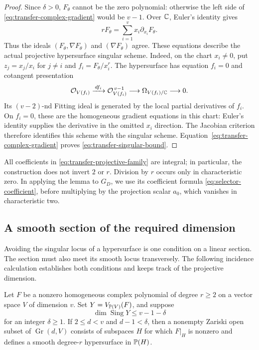\begin{proof}
Since \(\delta>0\), \(F_\theta\) cannot be the zero polynomial:
otherwise the left side of \eqref{eq:transfer-complex-gradient}
would be \(v-1\).  Over \(\mathbb C\), Euler's identity gives
\[
 rF_\theta=\sum_{i=1}^v x_i\partial_{x_i}F_\theta.
\]
Thus the ideals \((F_\theta,\nabla F_\theta)\) and
\((\nabla F_\theta)\) agree.  These equations describe the actual
projective hypersurface singular scheme.  Indeed, on the chart
\(x_i\ne0\), put \(z_j=x_j/x_i\) for \(j\ne i\) and
\(f_i=F_\theta/x_i^r\).  The hypersurface has equation \(f_i=0\)
and cotangent presentation
\[
 \mathcal O_{V(f_i)}
 \xrightarrow{\,df_i\,}
 \mathcal O_{V(f_i)}^{\,v-1}
 \longrightarrow\Omega_{V(f_i)/\mathbb C}\longrightarrow0.
\]
Its \((v-2)\)-nd Fitting ideal is generated by the local partial
derivatives of \(f_i\).  On \(f_i=0\), these are the homogeneous
gradient equations in this chart: Euler's identity supplies the
derivative in the omitted \(x_i\) direction.  The Jacobian criterion
therefore identifies this scheme with the singular scheme.
Equation~\eqref{eq:transfer-complex-gradient} proves
\eqref{eq:transfer-singular-bound}.
\end{proof}

All coefficients in \eqref{eq:transfer-projective-family} are integral;
in particular, the construction does not invert \(2\) or \(r\).
Division by \(r\) occurs only in characteristic zero.  In applying the
lemma to \(G_D\), we use its coefficient formula
\eqref{eq:selector-coefficient}, before multiplying by the projection
scalar \(a_0\), which vanishes in characteristic two.

\subsection{A smooth section of the required dimension}

Avoiding the singular locus of a hypersurface is one condition on a
linear section.  The section must also meet its smooth locus
transversely.  The following incidence calculation establishes both
conditions and keeps track of the projective dimension.

\begin{proposition}\label{prop:smooth-slice}
Let \(F\) be a nonzero homogeneous complex polynomial of degree \(r\ge2\)
on a vector space \(V\) of dimension \(v\).  Set
\(Y=V_{\mathbb P(V)}(F)\), and suppose
\[
 \dim\operatorname{Sing}Y\le v-1-\delta
\]
for an integer \(\delta\ge1\).  If \(2\le d<v\) and
\(d-1<\delta\), then a nonempty Zariski open subset of
\(\operatorname{Gr}(d,V)\) consists of subspaces \(H\) for which
\(F|_H\) is nonzero and defines a smooth degree-\(r\) hypersurface
in \(\mathbb P(H)\).
\end{proposition}

